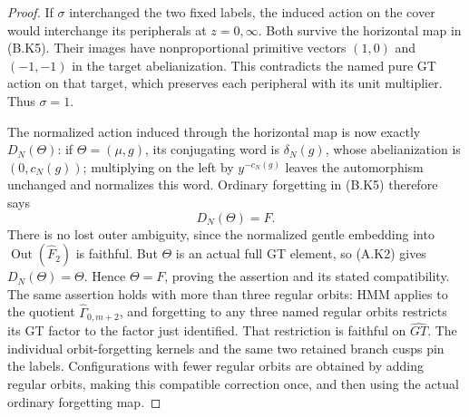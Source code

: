 \begin{proof}
If $\sigma$ interchanged the two fixed labels, the induced action
on the cover would interchange its peripherals at $z=0,\infty$.
Both survive the horizontal map in (B.K5).  Their images have
nonproportional primitive vectors $(1,0)$ and $(-1,-1)$ in the
target abelianization.  This contradicts the named pure GT action
on that target, which preserves each peripheral with its unit
multiplier.  Thus $\sigma=1$.

The normalized action induced through the horizontal map is now
exactly $D_N(\Theta)$: if $\Theta=(\mu,g)$, its conjugating word
is $\delta_N(g)$, whose abelianization is $(0,c_N(g))$;
multiplying on the left by $y^{-c_N(g)}$ leaves the automorphism
unchanged and normalizes this word.  Ordinary forgetting in
(B.K5) therefore says
\[
                         D_N(\Theta)=F.                \tag{B.K6}
\]
There is no lost outer ambiguity, since the normalized gentle
embedding into $\operatorname{Out}(\widehat F_2)$ is faithful.
But $\Theta$ is an actual full GT element, so (A.K2) gives
$D_N(\Theta)=\Theta$.  Hence $\Theta=F$, proving the assertion
and its stated compatibility.
The same assertion holds with more than three regular orbits:
HMM applies to the quotient $\widehat\Gamma_{0,m+2}$, and
forgetting to any three named regular orbits restricts its GT
factor to the factor just identified.  That restriction is
faithful on $\widehat{GT}$.  The individual orbit-forgetting
kernels and the same two retained branch cusps pin the labels.
Configurations with fewer regular orbits are obtained by adding
regular orbits, making this compatible correction once, and then
using the actual ordinary forgetting map.
\end{proof}

